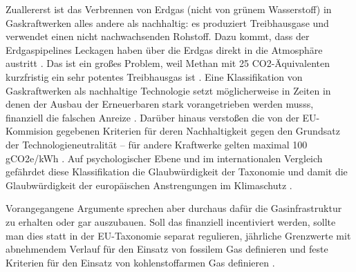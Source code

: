 Zuallererst ist das Verbrennen von Erdgas (nicht von grünem Wasserstoff) in Gaskraftwerken alles andere als nachhaltig: es produziert Treibhausgase und verwendet einen nicht nachwachsenden Rohstoff. Dazu kommt, dass der Erdgaspipelines Leckagen haben über die Erdgas direkt in die Atmosphäre austritt \cite{reuters}. Das ist ein großes Problem, weil Methan mit 25 CO2-Äquivalenten kurzfristig ein sehr potentes Treibhausgas ist \cite{uba-co2e}.
Eine Klassifikation von Gaskraftwerken als nachhaltige Technologie setzt möglicherweise in Zeiten in denen der Ausbau der Erneuerbaren stark vorangetrieben werden musss, finanziell die falschen Anreize \cite{uba}. Darüber hinaus verstoßen die von der EU-Kommision gegebenen Kriterien für deren Nachhaltigkeit gegen den Grundsatz der Technologieneutralität -- für andere Kraftwerke gelten maximal 100 gCO2e/kWh \cite{uba}.
Auf psychologischer Ebene und im internationalen Vergleich gefährdet diese Klassifikation die Glaubwürdigkeit der Taxonomie und damit die Glaubwürdigkeit der europäischen Anstrengungen im Klimaschutz \cite{dnr}.

Vorangegangene Argumente sprechen aber durchaus dafür die Gasinfrastruktur zu erhalten oder gar auszubauen. Soll das finanziell incentiviert werden, sollte man dies statt in der EU-Taxonomie separat regulieren, jährliche Grenzwerte mit abnehmendem Verlauf für den Einsatz von fossilem Gas definieren und feste Kriterien für den Einsatz von kohlenstoffarmen Gas definieren \cite{uba}.


